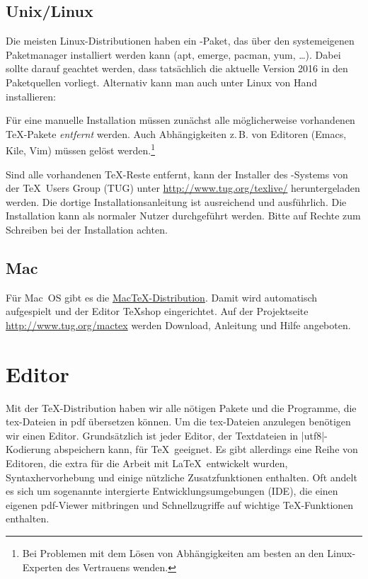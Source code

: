 \documentclass[
	datum=2016-10-17,
	titel=Installationshinweise,
]{../tex/latexkurs-exercise}
\begin{document}
\subsection*{Unix/Linux}

Die meisten Linux-Distributionen haben ein \TeXlive-Paket, das über den systemeigenen Paketmanager installiert werden kann (apt, emerge, pacman, yum, …).
Dabei sollte darauf geachtet werden, dass tatsächlich die aktuelle Version 2016 in den Paketquellen vorliegt. Alternativ kann man \TeXlive auch unter Linux von Hand installieren:


Für eine manuelle Installation müssen zunächst alle möglicherweise vorhandenen \TeX-Pakete \emph{entfernt} werden. Auch Abhängigkeiten z.\,B. von Editoren (Emacs, Kile, Vim) müssen gelöst werden.\footnote{Bei Problemen mit dem Lösen von Abhängigkeiten am besten an den Linux-Experten des Vertrauens wenden.}

Sind alle vorhandenen \TeX-Reste entfernt, kann der Installer des \TeXlive-Systems von der \TeX\ Users Group (TUG) unter \url{http://www.tug.org/texlive/} heruntergeladen werden. Die dortige Installationsanleitung ist ausreichend und ausführlich. Die Installation kann als normaler Nutzer durchgeführt werden. Bitte auf Rechte zum Schreiben bei der Installation achten.

\enlargethispage{\baselineskip}

\subsection*{Mac}
Für Mac~OS gibt es die \href{http://www.tug.org/mactex}{Mac\TeX-Distribution}. Damit wird automatisch  \TeXlive aufgespielt und  der Editor \TeX shop eingerichtet. Auf der Projektseite \url{http://www.tug.org/mactex} werden Download, Anleitung und Hilfe angeboten.


\newpage

\section{Editor}

Mit der \TeX-Distribution haben wir alle nötigen Pakete und die Programme, die tex-Dateien in pdf übersetzen können. Um die tex-Dateien anzulegen benötigen wir einen Editor. Grundsätzlich ist jeder Editor, der Textdateien in |utf8|-Kodierung abspeichern kann, für \TeX\ geeignet. Es gibt allerdings eine Reihe von Editoren, die extra für die Arbeit mit \LaTeX\ entwickelt wurden, Syntaxhervorhebung und einige nützliche Zusatzfunktionen enthalten. Oft andelt es sich um sogenannte intergierte Entwicklungsumgebungen (IDE), die einen eigenen pdf-Viewer mitbringen und Schnellzugriffe auf wichtige \TeX-Funktionen enthalten.
\end{document}
